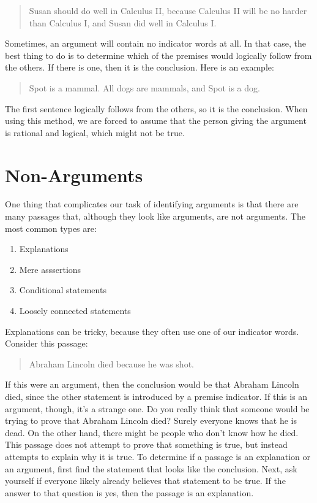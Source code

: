 \begin{quote}
Susan should do well in Calculus II, because Calculus II will be no harder than Calculus I, and Susan did well in Calculus I.
\end{quote}

Sometimes, an argument will contain no indicator words at all. In that case, the best thing to do is to determine which of the premises would logically follow from the others. If there is one, then it is the conclusion. Here is an example:

\begin{quote}
Spot is a mammal. All dogs are mammals, and Spot is a dog.
\end{quote}

The first sentence logically follows from the others, so it is the conclusion. When using this method, we are forced to assume that the person giving the argument is rational and logical, which might not be true.

\section{Non-Arguments}
\label{sec:non-arguments}

One thing that complicates our task of identifying arguments is that there are many passages that, although they look like arguments, are not arguments. The most common types are:

\begin{enumerate}
\item Explanations
\item Mere asssertions
\item Conditional statements
\item Loosely connected statements
\end{enumerate}

Explanations can be tricky, because they often use one of our indicator words. Consider this passage:

\begin{quote}
Abraham Lincoln died because he was shot.
\end{quote}

If this were an argument, then the conclusion would be that Abraham Lincoln died, since the other statement is introduced by a premise indicator. If this is an argument, though, it's a strange one. Do you really think that someone would be trying to prove that Abraham Lincoln died? Surely everyone knows that he is dead. On the other hand, there might be people who don't know how he died. This passage does not attempt to prove that something is true, but instead attempts to explain why it is true. To determine if a passage is an explanation or an argument, first find the statement that looks like the conclusion. Next, ask yourself if everyone likely already believes that statement to be true. If the answer to that question is yes, then the passage is an explanation.

